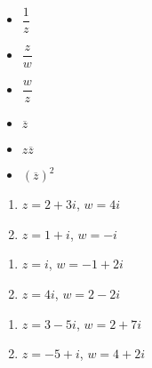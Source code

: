 \documentclass[10pt]{article}
\begin{document}
\begin{multicols}{3}

\begin{itemize}

\item $\dfrac{1}{z}$
\item $\dfrac{z}{w}$
\item $\dfrac{w}{z}$

\end{itemize}

\end{multicols}

\begin{multicols}{3}

\begin{itemize}

\item $\overline{z}$
\item $z\overline{z}$
\item $(\overline{z})^2$

\end{itemize}

\end{multicols}

\begin{multicols}{2}
\begin{enumerate}

\item  $z = 2+3i$, $w = 4i$ \label{compnumbasicfirst}
\item  $z = 1+i$, $w = -i$

\setcounter{HW}{\value{enumi}}
\end{enumerate}
\end{multicols}

\begin{multicols}{2}
\begin{enumerate}
\setcounter{enumi}{\value{HW}}

\item  $z = i$, $w = -1+2i$
\item  $z = 4i$, $w = 2-2i$

\setcounter{HW}{\value{enumi}}
\end{enumerate}
\end{multicols}

\begin{multicols}{2}
\begin{enumerate}
\setcounter{enumi}{\value{HW}}

\item  $z = 3-5i$, $w = 2+7i$
\item  $z = -5+i$, $w = 4+2i$

\setcounter{HW}{\value{enumi}}
\end{enumerate}
\end{multicols}
\end{document}

